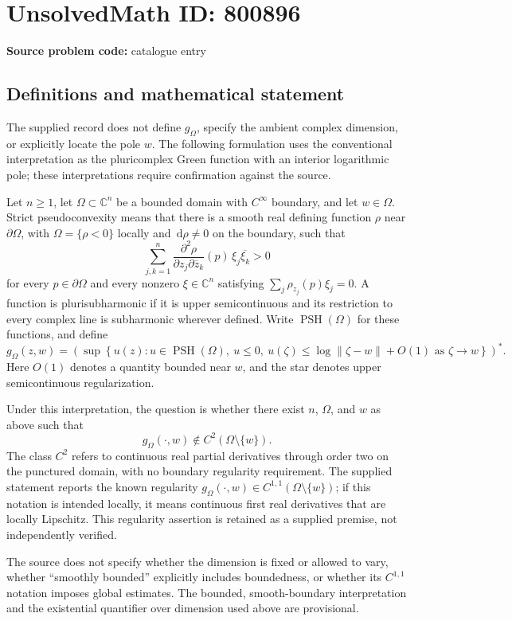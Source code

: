 \documentclass[11pt]{article}
\newcommand{\C}{\mathbb{C}}
\newcommand{\dd}{\,\mathrm{d}}
\begin{document}
\section*{UnsolvedMath ID: 800896}
\textbf{Source problem code:} catalogue entry
\subsection{Definitions and mathematical statement}
The supplied record does not define \(g_{\Omega}\), specify the ambient complex dimension, or explicitly locate the pole \(w\). The following formulation uses the conventional interpretation as the pluricomplex Green function with an interior logarithmic pole; these interpretations require confirmation against the source.

Let \(n\geq 1\), let \(\Omega\subset\C^n\) be a bounded domain with \(C^{\infty}\) boundary, and let \(w\in\Omega\). Strict pseudoconvexity means that there is a smooth real defining function \(\rho\) near \(\partial\Omega\), with \(\Omega=\{\rho<0\}\) locally and \(\dd\rho\ne0\) on the boundary, such that
\[
\sum_{j,k=1}^{n}\frac{\partial^2\rho}{\partial z_j\partial\overline z_k}(p)\,\xi_j\overline{\xi_k}>0
\]
for every \(p\in\partial\Omega\) and every nonzero \(\xi\in\C^n\) satisfying \(\sum_j\rho_{z_j}(p)\xi_j=0\). A function is plurisubharmonic if it is upper semicontinuous and its restriction to every complex line is subharmonic wherever defined. Write \(\operatorname{PSH}(\Omega)\) for these functions, and define
\[
g_{\Omega}(z,w)=\left(\sup\left\{u(z):u\in\operatorname{PSH}(\Omega),\ u\leq0,\ u(\zeta)\leq\log\|\zeta-w\|+O(1)\text{ as }\zeta\to w\right\}\right)^*.
\]
Here \(O(1)\) denotes a quantity bounded near \(w\), and the star denotes upper semicontinuous regularization.

Under this interpretation, the question is whether there exist \(n\), \(\Omega\), and \(w\) as above such that
\[
g_{\Omega}(\cdot,w)\notin C^2(\Omega\setminus\{w\}).
\]
The class \(C^2\) refers to continuous real partial derivatives through order two on the punctured domain, with no boundary regularity requirement. The supplied statement reports the known regularity \(g_{\Omega}(\cdot,w)\in C^{1,1}(\Omega\setminus\{w\})\); if this notation is intended locally, it means continuous first real derivatives that are locally Lipschitz. This regularity assertion is retained as a supplied premise, not independently verified.

The source does not specify whether the dimension is fixed or allowed to vary, whether ``smoothly bounded'' explicitly includes boundedness, or whether its \(C^{1,1}\) notation imposes global estimates. The bounded, smooth-boundary interpretation and the existential quantifier over dimension used above are provisional.
\end{document}
